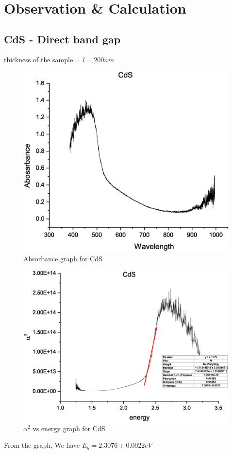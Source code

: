 \section{Observation \& Calculation}

	\subsection{CdS - Direct band gap}
		thickness of the sample = $l = 200nm$

		\begin{figure}[h]
			\centering
			\includegraphics[width=0.8\columnwidth]{images/cda.eps}
			\caption{Absorbance graph for CdS}
			\label{graph:1}
		\end{figure}
		\begin{figure}[h]
			\centering
			\includegraphics[width=0.8\columnwidth]{images/cds.eps}
			\caption{$\alpha^2$ vs energy graph for CdS}
			\label{graph:2}
		\end{figure}
		From the graph, We have $E_g= 2.3076\pm0.0022eV$

